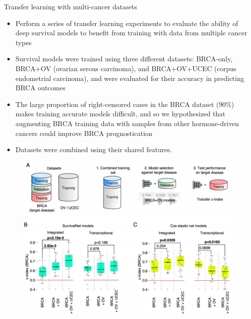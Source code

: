 \documentclass[
]{beamer}
\begin{document}
	
	\begin{frame}{Transfer learning with multi-cancer datasets}
		\begin{itemize}
			\item Perform a series of transfer learning experiments
			to evaluate the ability of deep survival models to benefit from training with data from multiple cancer
			types
			\item  Survival models were trained using three different
			datasets: BRCA-only, BRCA+OV (ovarian serous carcinoma), and BRCA+OV+UCEC (corpus endometrial
			carcinoma), and were evaluated for their accuracy in predicting BRCA outcomes
			\item The large proportion of
			right-censored cases in the BRCA dataset (90\%) makes training accurate models difficult, and so we hypothesized
			that augmenting BRCA training data with samples from other hormone-driven cancers could improve BRCA
			prognostication 
			\item Datasets were combined using their shared features. 
			
		\end{itemize}
	\end{frame}
	
	\begin{frame}
		\begin{figure}
			\includegraphics[scale=0.45]{trans1}
		\end{figure}
	\end{frame}
	
\end{document}
